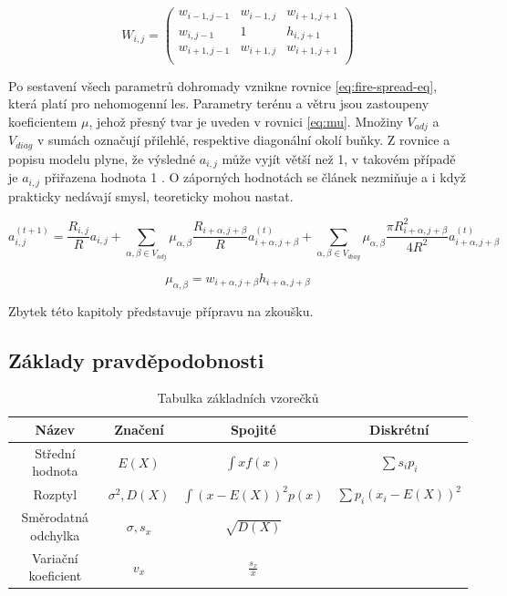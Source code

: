 \documentclass[11pt,a4paper]{scrartcl}
\begin{document}
	\begin{equation}
	W_{i,j} =
	\begin{pmatrix}
	w_{i-1,j-1}       & w_{i-1,j} & w_{i+1,j+1} \\
	w_{i,j-1}       & 1 & h_{i,j+1} \\
	w_{i+1,j-1}       & w_{i+1,j} & w_{i+1,j+1} \\
	\end{pmatrix}
	\label{eq:wind-matrix}
	\end{equation}	
	
	Po sestavení všech parametrů dohromady vznikne rovnice \ref{eq:fire-spread-eq}, která platí pro nehomogenní les. Parametry terénu a větru jsou zastoupeny koeficientem $\mu$, jehož přesný tvar je uveden v rovnici \ref{eq:mu}. Množiny $V_{adj}$ a $V_{diag}$ v sumách označují přilehlé, respektive diagonální okolí buňky. Z rovnice a popisu modelu plyne, že výsledné $a_{i,j}$ může vyjít větší než 1, v takovém případě je $a_{i,j}$ přiřazena hodnota 1 \cite{source_article}. O záporných hodnotách se článek nezmiňuje a i když prakticky nedávají smysl, teoreticky mohou nastat.
	
	\begin{equation}
	a_{i,j}^{(t+1)} = \frac{R_{i,j}}{R}a_{i,j} + 
	\sum_{\alpha,\beta \in V_{adj}} \mu_{\alpha,\beta} \frac{R_{i + \alpha, j+\beta}}{R} a_{i + \alpha, j + \beta} ^{(t)} + 
	\sum_{\alpha,\beta \in V_{diag}} \mu_{\alpha,\beta} \frac{\pi R_{i + \alpha, j+\beta} ^2}{4R^2} a_{i + \alpha, j + \beta} ^{(t)}	
	\label{eq:fire-spread-eq}
	\end{equation}
	
	\begin{equation}
		\mu_{\alpha,\beta} = w_{i+\alpha, j+\beta} h_{i+\alpha, j+\beta}
		\label{eq:mu}
	\end{equation}
	
	Zbytek této kapitoly představuje přípravu na zkoušku.
	
	\subsection{Základy pravděpodobnosti}
	\begin{table}[H]
		\centering
		\begin{tabular}{|c|c|c|c|}
			\hline
			Název & Značení & Spojité & Diskrétní \\
			\hline
			\hline
			Střední hodnota & $E(X)$ & $\int{xf(x)}$ & $\sum s_ip_i$ \\
			\hline
			Rozptyl & $\sigma^2, D(X)$ & $\int{(x-E(X))^2p(x)}$& $\sum p_i(x_i - E(X))^2$ \\
			\hline
			Směrodatná odchylka & $\sigma, s_x$ & $\sqrt{D(X)}$ & \\
			\hline
			Variační koeficient & $v_x$ & $\frac{s_x}{\bar{x}}$ & \\
			\hline
		\end{tabular}
		\caption{Tabulka základních vzorečků}
	\end{table}
\end{document}
